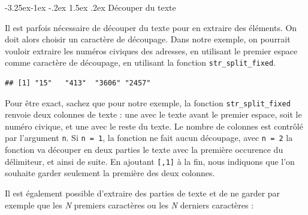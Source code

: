 \documentclass[
  11pt,
  french,
]{book}
\makeatletter
\newenvironment{Shaded}{\begin{snugshade}}{\end{snugshade}}
\newcommand{\CommentTok}[1]{\textcolor[rgb]{0.56,0.35,0.01}{\textit{#1}}}
\newcommand{\DataTypeTok}[1]{\textcolor[rgb]{0.13,0.29,0.53}{#1}}
\newcommand{\DecValTok}[1]{\textcolor[rgb]{0.00,0.00,0.81}{#1}}
\newcommand{\KeywordTok}[1]{\textcolor[rgb]{0.13,0.29,0.53}{\textbf{#1}}}
\newcommand{\NormalTok}[1]{#1}
\newcommand{\OperatorTok}[1]{\textcolor[rgb]{0.81,0.36,0.00}{\textbf{#1}}}
\newcommand{\StringTok}[1]{\textcolor[rgb]{0.31,0.60,0.02}{#1}}
\newenvironment{kframe}{%
\medskip{}
\setlength{\fboxsep}{.8em}
 \def\at@end@of@kframe{}%
 \ifinner\ifhmode%
  \def\at@end@of@kframe{\end{minipage}}%
  \begin{minipage}{\columnwidth}%
 \fi\fi%
 \def\FrameCommand##1{\hskip\@totalleftmargin \hskip-\fboxsep
 \colorbox{shadecolor}{##1}\hskip-\fboxsep
     \hskip-\linewidth \hskip-\@totalleftmargin \hskip\columnwidth}%
 \MakeFramed {\advance\hsize-\width
   \@totalleftmargin\z@ \linewidth\hsize
   \@setminipage}}%
 {\par\unskip\endMakeFramed%
 \at@end@of@kframe}
\renewenvironment{Shaded}{\begin{kframe}}{\end{kframe}}
\renewcommand\paragraph{\@startsection{paragraph}{4}{\z@}%
   {-3.25ex\@plus -1ex \@minus -.2ex}%
   {1.5ex \@plus .2ex}%
   {\normalfont\normalsize\bfseries}}
\makeatother
\begin{document}
\hypertarget{sect014253}{%
\paragraph{Découper du texte}\label{sect014253}}

Il est parfois nécessaire de découper du texte pour en extraire des éléments. On doit alors choisir un caractère de découpage. Dans notre exemple, on pourrait vouloir extraire les numéros civiques des adresses, en utilisant le premier espace comme caractère de découpage, en utilisant la fonction \texttt{str\_split\_fixed}.

\begin{Shaded}
\end{Shaded}

\begin{verbatim}
## [1] "15"   "413"  "3606" "2457"
\end{verbatim}

Pour être exact, sachez que pour notre exemple, la fonction \texttt{str\_split\_fixed} renvoie deux colonnes de texte : une avec le texte avant le premier espace, soit le numéro civique, et une avec le reste du texte. Le nombre de colonnes est contrôlé par l'argument \texttt{n}. Si \texttt{n\ =\ 1}, la fonction ne fait aucun découpage, avec \texttt{n\ =\ 2} la fonction va découper en deux parties le texte avec la première occurence du délimiteur, et ainsi de suite. En ajoutant \texttt{{[},1{]}} à la fin, nous indiquons que l'on souhaite garder seulement la première des deux colonnes.

Il est également possible d'extraire des parties de texte et de ne garder par exemple que les \emph{N} premiers caractères ou les \emph{N} derniers caractères :

\begin{Shaded}
\end{Shaded}
\end{document}
